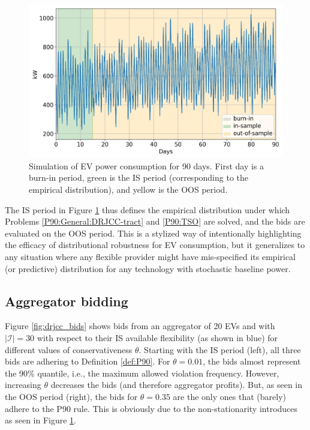 \documentclass[conference]{IEEEtran}
\begin{document}
\begin{figure}[t]
    \centering
    \includegraphics[width=\columnwidth]{../figures/drjcc_raw.png}
    \caption{Simulation of \ac{EV} power consumption for 90 days. First day is a burn-in period, green is the \ac{IS} period (corresponding to the empirical distribution), and yellow is the \ac{OOS} period.}
    \label{fig:drjcc_raw}
\end{figure}

The \ac{IS} period in Figure \ref{fig:drjcc_raw} thus defines the empirical distribution under which Problems \eqref{P90:General:DRJCC-tract} and \eqref{P90:TSO} are solved, and the bids are evaluated on the \ac{OOS} period. This is a stylized way of intentionally highlighting the efficacy of distributional robustness for \ac{EV} consumption, but it generalizes to any situation where any flexible provider might have mis-specified its empirical (or predictive) distribution for any technology with stochastic baseline power.

\subsection{Aggregator bidding}

Figure \ref{fig:drjcc_bids} shows bids from an aggregator of 20 \acp{EV} and with $|\mathcal{I}| = 30$ with respect to their \ac{IS} available flexibility (as shown in blue) for different values of conservativeness $\theta$. Starting with the \ac{IS} period (left), all three bids are adhering to Definition \ref{def:P90}. For $\theta = 0.01$, the bids almost represent the 90\% quantile, i.e., the maximum allowed violation frequency. However, increasing $\theta$ decreases the bids (and therefore aggregator profits). But, as seen in the \ac{OOS} period (right), the bids for $\theta = 0.35$ are the only ones that (barely) adhere to the P90 rule. This is obviously due to the non-stationarity introduces as seen in Figure \ref{fig:drjcc_raw}.
\end{document}
